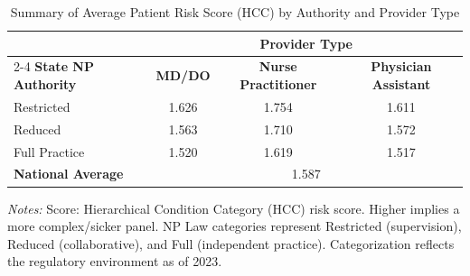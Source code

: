 \begin{table}[htbp]
    \centering
    \caption{Summary of Average Patient Risk Score (HCC) by Authority and Provider Type}
    \label{tab:bene_avg_risk_scre_provtype}
    \vspace{0.2cm}
    \begin{tabular}{lccc}
        \toprule
        & \multicolumn{3}{c}{\textbf{Provider Type}} \\
        \cmidrule(lr){2-4}
        \textbf{State NP Authority} & \textbf{MD/DO} & \textbf{Nurse Practitioner} & \textbf{Physician Assistant} \\
        \midrule
        Restricted & 1.626 & 1.754 & 1.611 \\
        Reduced & 1.563 & 1.710 & 1.572 \\
        Full Practice & 1.520 & 1.619 & 1.517 \\
        \midrule
        \textbf{National Average} & \multicolumn{3}{c}{1.587} \\
        \bottomrule
    \end{tabular}
    \vspace{0.1cm}
    \begin{minipage}{0.85\textwidth}
        \footnotesize \textit{Notes:} Score: Hierarchical Condition Category (HCC) risk score. Higher implies a more complex/sicker panel. NP Law categories represent Restricted (supervision), Reduced (collaborative), and Full (independent practice). Categorization reflects the regulatory environment as of 2023.
    \end{minipage}
\end{table}